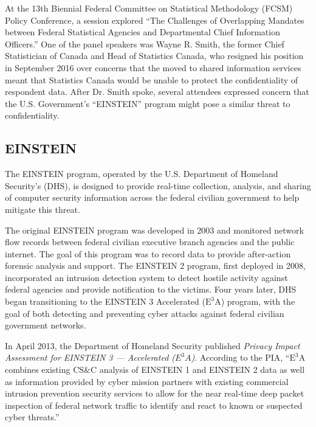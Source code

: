 \documentclass[fleqn,10pt]{wlscirep}
\newcommand{\ETA}{$\textrm{E}^\textrm{3}\textrm{A}$\xspace}
\begin{document}
At the 13th Biennial Federal Committee on Statistical Methodology
(FCSM) Policy Conference, a session explored ``The Challenges of
Overlapping Mandates between Federal Statistical Agencies and
Departmental Chief Information Officers.''\cite{fcsm-program} One of
the panel speakers was Wayne R. Smith, the former Chief Statistician
of Canada and Head of Statistics Canada, who resigned his position in
September 2016 over concerns that the moved to shared information services
meant that Statistics Canada would be unable to
protect the confidentiality of respondent
data\cite{ottawacitizen}. After Dr. Smith spoke, several attendees
expressed concern that the U.S. Government's ``EINSTEIN'' program
might pose a similar threat to confidentiality. 

\subsection{EINSTEIN}

The EINSTEIN program, operated by the U.S. Department of Homeland
Security's (DHS), is designed to provide real-time collection,
analysis, and sharing of computer security information across the
federal civilian government to help mitigate this
threat.\cite{dhs-einstein-2004}

The original EINSTEIN program was developed in 2003 and monitored
network flow records between federal civilian executive branch
agencies and the public internet. The goal of this program was to
record data to provide after-action forensic analysis and support. The
EINSTEIN 2 program, first deployed in 2008, incorporated an intrusion
detection system to detect hostile activity against federal agencies
and provide notification to the victims. Four years later, DHS began
transitioning to the EINSTEIN 3 Accelerated (\ETA) program, with the
goal of both detecting and preventing cyber attacks against federal
civilian government networks.\cite{dhs-einstein}

In April 2013, the Department of Homeland Security published 
\emph{Privacy Impact Assessment for EINSTEIN 3 --- Accelerated
  ($E^3A$)}\cite{dhs-e3a-pia}. According to the PIA, ``\ETA combines
existing CS\&C analysis of EINSTEIN 1 and EINSTEIN 2 data as well as
information provided by cyber mission partners with existing
commercial intrusion prevention security services to allow for the
near real-time deep packet inspection of federal network traffic to
identify and react to known or suspected cyber threats.''\cite[p.4]{dhs-e3a-pia}
\end{document}
